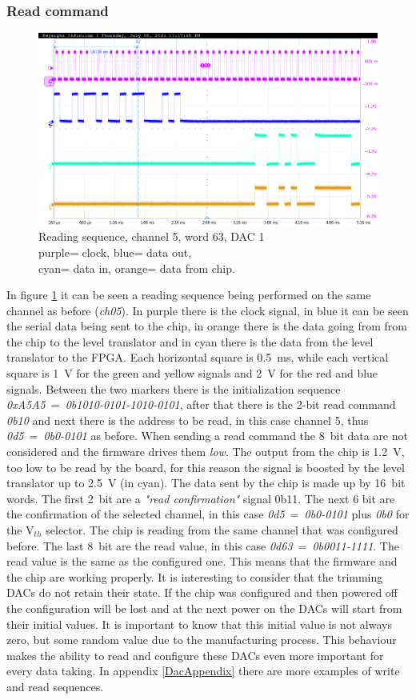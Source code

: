 \subsubsection{Read command}
\begin{figure}[H]
	\centering
	\includegraphics[width=0.7\linewidth]{IMG/ch5/probe/09-08-2021_ch05-read63-baselinedac1}
	\caption{Reading sequence, channel 5, word 63, DAC 1\\{\color{magenta}purple}= clock, {\color{blue}blue}= data out,\\{\color{cyan}cyan}= data in, {\color{orange}orange}= data from chip.}
	\label{fig:ch05read63}
\end{figure}
\noindent In figure \ref{fig:ch05read63} it can be seen a reading sequence being performed on the same channel as before (\textit{ch05}).
In purple there is the clock signal, in blue it can be seen the serial data being sent to the chip, in orange there is the data going from from the chip to the level translator and in cyan there is the data from the level translator to the FPGA.
Each horizontal square is 0.5~ms, while each vertical square is 1~V for the green and yellow signals and 2~V for the red and blue signals.
Between the two markers there is the initialization sequence \textit{0xA5A5}~=~\textit{0b1010-0101-1010-0101}, after that there is the 2-bit read command \textit{0b10} and next there is the address to be read, in this case channel 5, thus \textit{0d5}~=~\textit{0b0-0101} as before.
When sending a read command the 8~bit data are not considered and the firmware drives them \textit{low}.
The output from the chip is 1.2~V, too low to be read by the board, for this reason the signal is boosted by the level translator up to 2.5~V (in cyan).
The data sent by the chip is made up by 16~bit words. The first 2~bit are a \textit{"read confirmation"} signal 0b11. The next 6 bit are the confirmation of the selected channel, in this case \textit{0d5}~=~\textit{0b0-0101} plus \textit{0b0} for the V$_{th}$ selector.
The chip is reading from the same channel that was configured before.
The last 8~bit are the read value, in this case \textit{0d63}~=~\textit{0b0011-1111}.
The read value is the same as the configured one. This means that the firmware and the chip are working properly.
It is interesting to consider that the trimming DACs do not retain their state.
If the chip was configured and then powered off the configuration will be lost and at the next power on the DACs will start from their initial values.
It is important to know that this initial value is not always zero, but some random value due to the manufacturing process.
This behaviour makes the ability to read and configure these DACs even more important for every data taking. In appendix \ref{DacAppendix} there are more examples of write and read sequences. 

